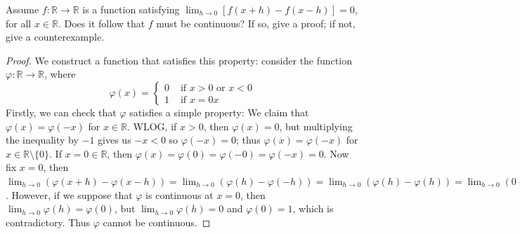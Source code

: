 \documentclass[oneside]{amsart}
\theoremstyle{definition}
\newcommand{\rr}{\mathbb R}
\begin{document}
 \begin{tcolorbox}[colback=black!5!white,colframe=black!75!black,title= Chapter 5; $\S 2.1$: Exercise $2.2.$]  Assume $f \colon \rr \to \rr$ is a function satisfying $\lim_{h \to 0} [f(x+h) -f(x-h)] = 0$, for all $x \in \rr$. Does it follow that $f$ must be continuous? If so, give a proof; if not, give a counterexample.
\tcblower 
\begin{proof} We construct a function that satisfies this property: consider the function $\varphi  \colon \rr \to \rr $, where   
\[
\varphi (x) = \begin{cases}
	0 & \text{ if $x > 0$ or $x< 0$}\\
	1 & \text{ if $x =0$}x
\end{cases}
\]
Firstly, we can check that $\varphi$ satisfies a simple property: We claim that $\varphi (x) = \varphi (-x)$ for $x \in \rr$. WLOG, if $x > 0$, then $\varphi (x) = 0$, but multiplying the inequality by $-1$ gives us $-x< 0$ so $\varphi (-x) = 0$; thus $\varphi (x) = \varphi (-x)$ for $x \in \rr \setminus \{ 0 \}$. If $x = 0 \in \rr$, then $\varphi (x) = \varphi (0) = \varphi (-0) = \varphi (-x) = 0$. Now fix $x = 0$, then $\lim_{h \to 0} (\varphi(x+h) -\varphi(x-h) )= \lim _{h \to 0}  (\varphi(h) - \varphi(-h) )= \lim _{h \to 0}  (\varphi(h) - \varphi(h) ) = \lim_{h \to 0} (0 -0) = 0$. However, if we suppose that $\varphi$ is continuous at $x = 0$, then $\lim_{h \to 0} \varphi(h) = \varphi (0)$, but $\lim_{h \to 0} \varphi (h) = 0$ and $\varphi (0) = 1$, which is contradictory. Thus $\varphi $ cannot be continuous. 
\end{proof}
\end{tcolorbox}
\end{document}
